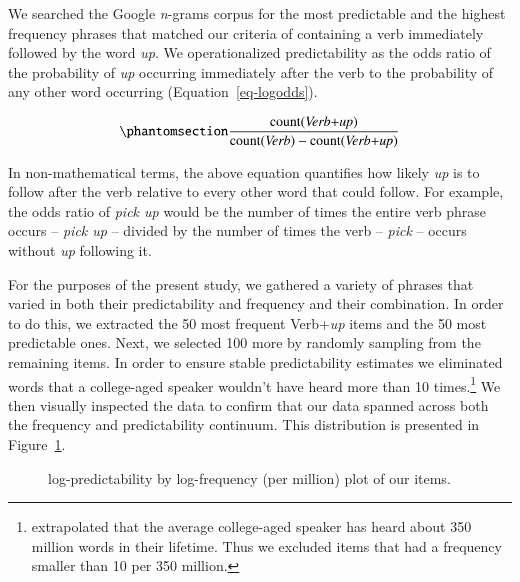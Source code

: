 \documentclass[
  authoryear,
  preprint,
  1p,
  onecolumn]{elsarticle}
\begin{document}
We searched the Google \emph{n}-grams corpus
\citep{linSyntacticAnnotationsGoogle2012} for the most predictable and
the highest frequency phrases that matched our criteria of containing a
verb immediately followed by the word \emph{up}. We operationalized
predictability as the odds ratio of the probability of \emph{up}
occurring immediately after the verb to the probability of any other
word occurring (Equation~\ref{eq-logodds}).

\begin{equation}\phantomsection\label{eq-logodds}{
\frac{\mathrm{count(\textit{Verb+up})}}{\mathrm{count(\textit{Verb})} - \mathrm{count(\textit{Verb+up})}} 
}\end{equation}

In non-mathematical terms, the above equation quantifies how likely
\emph{up} is to follow after the verb relative to every other word that
could follow. For example, the odds ratio of \emph{pick up} would be the
number of times the entire verb phrase occurs -- \emph{pick up} --
divided by the number of times the verb -- \emph{pick} -- occurs without
\emph{up} following it.

For the purposes of the present study, we gathered a variety of phrases
that varied in both their predictability and frequency and their
combination. In order to do this, we extracted the 50 most frequent
Verb+\emph{up} items and the 50 most predictable ones. Next, we selected
100 more by randomly sampling from the remaining items. In order to
ensure stable predictability estimates we eliminated words that a
college-aged speaker wouldn't have heard more than 10 times.\footnote{\citet{levyProcessingExtraposedStructures2012}
  extrapolated that the average college-aged speaker has heard about 350
  million words in their lifetime. Thus we excluded items that had a
  frequency smaller than 10 per 350 million.} We then visually inspected
the data to confirm that our data spanned across both the frequency and
predictability continuum. This distribution is presented in
Figure~\ref{fig-stimplot}.

\begin{figure}


\caption{\label{fig-stimplot}log-predictability by log-frequency (per
million) plot of our items.}

\end{figure}%
\end{document}
